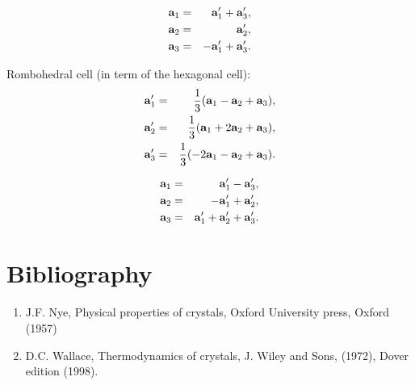 \documentclass[12pt,a4paper]{article}
\begin{document}
\begin{eqnarray}
{\bf a}_1&=& {\bf a}_1' + {\bf a}_3', \\
{\bf a}_2&=& {\bf a}_2', \\
{\bf a}_3&=& -{\bf a}_1' + {\bf a}_3'.
\end{eqnarray}

Rombohedral cell (in term of the hexagonal cell):
\begin{eqnarray}
{\bf a}_1'&=&{1\over 3} ({\bf a}_1 - {\bf a}_2 + {\bf a}_3), \\
{\bf a}_2'&=&{1\over 3} ({\bf a}_1 + 2 {\bf a}_2 + {\bf a}_3), \\
{\bf a}_3'&=&{1\over 3} (-2 {\bf a}_1 - {\bf a}_2 + {\bf a}_3). 
\end{eqnarray}

\begin{eqnarray}
{\bf a}_1&=& {\bf a}_1' - {\bf a}_3', \\
{\bf a}_2&=& - {\bf a}_1' + {\bf a}_2', \\
{\bf a}_3&=& {\bf a}_1' + {\bf a}_2' + {\bf a}_3'.
\end{eqnarray}

\newpage

\section{\color{coral}Bibliography}
\begin{enumerate}

\item
J.F. Nye, Physical properties of crystals, Oxford University press, 
Oxford (1957)

\item
D.C. Wallace, Thermodynamics of crystals, J. Wiley and Sons, (1972),
Dover edition (1998).

\end{enumerate}
\end{document}
